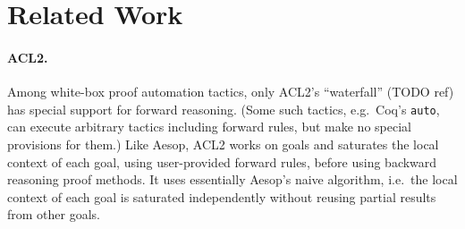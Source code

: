 \documentclass[runningheads]{llncs}
\begin{document}
            \begin{figure}
                    \end{figure}

\section{Related Work}

\paragraph{ACL2.}
Among white-box proof automation tactics, only ACL2's \enquote{waterfall} (TODO ref) has special support for forward reasoning.
(Some such tactics, e.g.\ Coq's \texttt{auto}, can execute arbitrary tactics including forward rules, but make no special provisions for them.)
Like Aesop, ACL2 works on goals and saturates the local context of each goal, using user-provided forward rules, before using backward reasoning proof methods.
It uses essentially Aesop's naive algorithm, i.e.\ the local context of each goal is saturated independently without reusing partial results from other goals.
\end{document}
